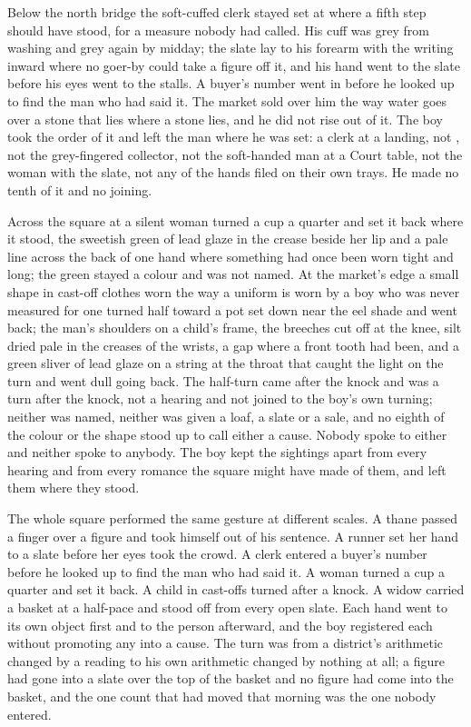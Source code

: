 Below the north bridge the soft-cuffed clerk stayed set at  where a fifth step should have stood, for a measure nobody had called. His cuff was grey from washing and grey again by midday; the slate lay to his forearm with the writing inward where no goer-by could take a figure off it, and his hand went to the slate before his eyes went to the stalls. A buyer's number went in before he looked up to find the man who had said it. The market sold over him the way water goes over a stone that lies where a stone lies, and he did not rise out of it. The boy took the order of it and left the man where he was set: a clerk at a landing, not , not the grey-fingered collector, not the soft-handed man at a Court table, not the woman with the slate, not any of the hands filed on their own trays. He made no tenth of it and no joining.

Across the square at  a silent woman turned a cup a quarter and set it back where it stood, the sweetish green of lead glaze in the crease beside her lip and a pale line across the back of one hand where something had once been worn tight and long; the green stayed a colour and was not named. At the market's edge a small shape in cast-off clothes worn the way a uniform is worn by a boy who was never measured for one turned half toward a pot set down near the eel shade and went back; the man's shoulders on a child's frame, the breeches cut off at the knee, silt dried pale in the creases of the wrists, a gap where a front tooth had been, and a green sliver of lead glaze on a string at the throat that caught the light on the turn and went dull going back. The half-turn came after the knock and was a turn after the knock, not a hearing and not joined to the boy's own turning; neither was named, neither was given a loaf, a slate or a sale, and no eighth of the colour or the shape stood up to call either a cause. Nobody spoke to either and neither spoke to anybody. The boy kept the sightings apart from every hearing and from every romance the square might have made of them, and left them where they stood.

The whole square performed the same gesture at different scales. A thane passed a finger over a figure and took himself out of his sentence. A runner set her hand to a slate before her eyes took the crowd. A clerk entered a buyer's number before he looked up to find the man who had said it. A woman turned a cup a quarter and set it back. A child in cast-offs turned after a knock. A widow carried a basket at a half-pace and stood off from every open slate. Each hand went to its own object first and to the person afterward, and the boy registered each without promoting any into a cause. The turn was from a district's arithmetic changed by a reading to his own arithmetic changed by nothing at all; a figure had gone into a slate over the top of the basket and no figure had come into the basket, and the one count that had moved that morning was the one nobody entered.

